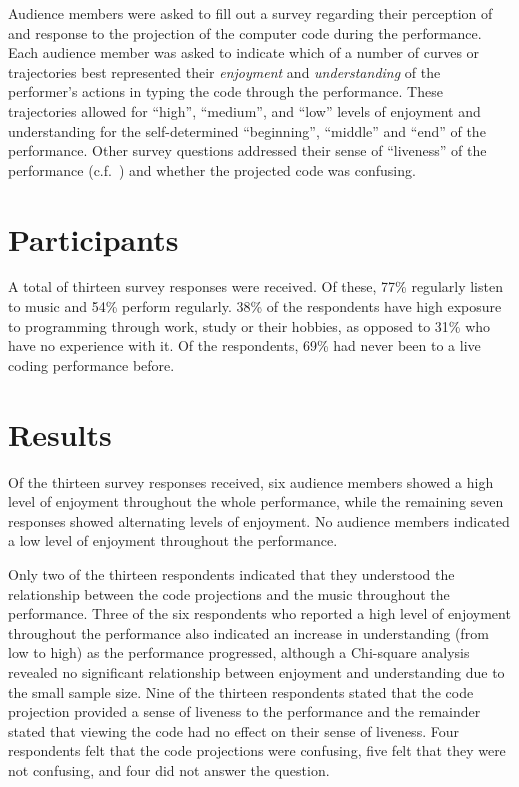 Audience members were asked to fill out a survey regarding their perception of and response to the projection of the computer code during the
performance. Each audience member was asked to indicate which of a
number of curves or trajectories best represented their \emph{enjoyment}
and \emph{understanding} of the performer's actions in typing the code
through the performance. These trajectories allowed for ``high'',
``medium'', and ``low'' levels of enjoyment and understanding for the
self-determined ``beginning'', ``middle'' and ``end'' of the
performance. Other survey questions addressed their sense of
``liveness'' of the performance (c.f.~\cite{Auslander}) and whether
the projected code was confusing.

\section{Participants}

A total of thirteen survey responses were received. Of these, 77\% regularly listen to music and 54\% perform regularly. 38\% of the respondents have high exposure to programming through work, study or their hobbies, as opposed to 31\% who have no experience with it. Of the respondents, 69\% had never been to a live coding performance before.

\section{Results}

Of the thirteen survey responses received, six audience members showed
a high level of enjoyment throughout the whole performance, while the
remaining seven responses showed alternating levels of enjoyment. No
audience members indicated a low level of enjoyment throughout the
performance.

Only two of the thirteen respondents indicated that they understood
the relationship between the code projections and the music throughout
the performance. Three of the six respondents who reported a high
level of enjoyment throughout the performance also indicated an
increase in understanding (from low to high) as the performance
progressed, although a Chi-square analysis revealed no significant
relationship between enjoyment and understanding due to the small
sample size. Nine of the thirteen respondents stated that the code
projection provided a sense of liveness to the performance and the
remainder stated that viewing the code had no effect on their sense of
liveness. Four respondents felt that the code projections were
confusing, five felt that they were not confusing, and four did not
answer the question.

